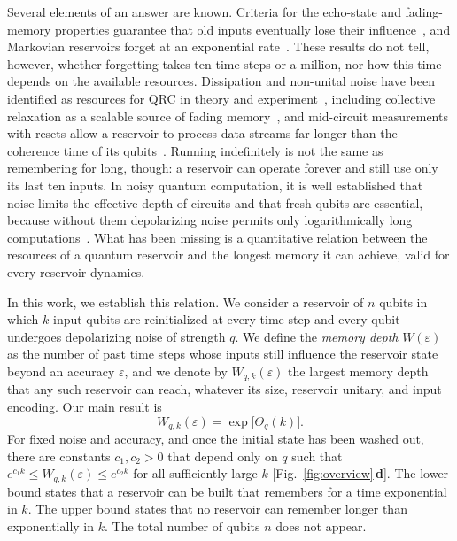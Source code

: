 \documentclass[aps,pra,reprint,superscriptaddress,floatfix]{revtex4-2}
\theoremstyle{plain}
\newcommand{\pnl}[1]{\textsf{\textbf{#1}}}
\begin{document}
Several elements of an answer are known. Criteria for the echo-state and fading-memory properties guarantee that old inputs eventually lose their influence~\cite{MartinezPena2023,MorguiSancho2026}, and Markovian reservoirs forget at an exponential rate~\cite{Sannia2026}. These results do not tell, however, whether forgetting takes ten time steps or a million, nor how this time depends on the available resources. Dissipation and non-unital noise have been identified as resources for QRC in theory and experiment~\cite{Chen2020,Kubota2023,Sannia2024,Monzani2024}, including collective relaxation as a scalable source of fading memory~\cite{Freiheit2026}, and mid-circuit measurements with resets allow a reservoir to process data streams far longer than the coherence time of its qubits~\cite{Yasuda2023,Hu2024}. Running indefinitely is not the same as remembering for long, though: a reservoir can operate forever and still use only its last ten inputs. In noisy quantum computation, it is well established that noise limits the effective depth of circuits and that fresh qubits are essential, because without them depolarizing noise permits only logarithmically long computations~\cite{Aharonov1996,BenOr2013,StilckFranca2021,Mele2026}. What has been missing is a quantitative relation between the resources of a quantum reservoir and the longest memory it can achieve, valid for every reservoir dynamics.

In this work, we establish this relation. We consider a reservoir of $n$ qubits in which $k$ input qubits are reinitialized at every time step and every qubit undergoes depolarizing noise of strength $q$. We define the \emph{memory depth} $W(\varepsilon)$ as the number of past time steps whose inputs still influence the reservoir state beyond an accuracy $\varepsilon$, and we denote by $W_{q,k}(\varepsilon)$ the largest memory depth that any such reservoir can reach, whatever its size, reservoir unitary, and input encoding. Our main result is
\begin{equation}
W_{q,k}(\varepsilon)=\exp\!\big[\Theta_q(k)\big].
\label{eq:main}
\end{equation}
For fixed noise and accuracy, and once the initial state has been washed out, there are constants $c_1,c_2>0$ that depend only on $q$ such that $e^{c_1k}\le W_{q,k}(\varepsilon)\le e^{c_2k}$ for all sufficiently large $k$ [Fig.~\ref{fig:overview}\,\pnl{d}]. The lower bound states that a reservoir can be built that remembers for a time exponential in $k$. The upper bound states that no reservoir can remember longer than exponentially in $k$. The total number of qubits $n$ does not appear.
\end{document}
